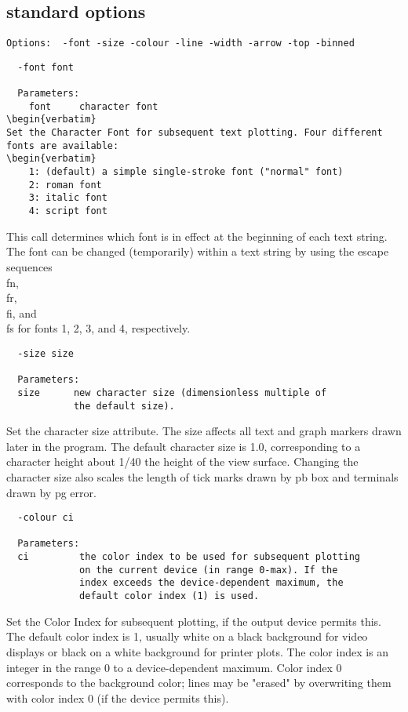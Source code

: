 \subsection{standard options}
\begin{verbatim}
Options:  -font -size -colour -line -width -arrow -top -binned
\end{verbatim}
\begin{verbatim}
  -font font
  
  Parameters:
    font     character font
\begin{verbatim}
Set the Character Font for subsequent text plotting. Four different
fonts are available:
\begin{verbatim}
    1: (default) a simple single-stroke font ("normal" font)
    2: roman font
    3: italic font
    4: script font
\end{verbatim}
This call determines which font is in effect at the beginning of
each text string. The font can be changed (temporarily) within a text
string by using the escape sequences \\fn, \\fr, \\fi, and \\fs for fonts
1, 2, 3, and 4, respectively.

\begin{verbatim}
  -size size

  Parameters:
  size      new character size (dimensionless multiple of
            the default size).
\end{verbatim}
Set the character size attribute. The size affects all text and graph
markers drawn later in the program. The default character size is
1.0, corresponding to a character height about 1/40 the height of
the view surface.  Changing the character size also scales the length
of tick marks drawn by pb box and terminals drawn by pg error.

\begin{verbatim}
  -colour ci

  Parameters:
  ci         the color index to be used for subsequent plotting
             on the current device (in range 0-max). If the
             index exceeds the device-dependent maximum, the
             default color index (1) is used.
\end{verbatim}
Set the Color Index for subsequent plotting, if the output device
permits this. The default color index is 1, usually white on a black
background for video displays or black on a white background for
printer plots. The color index is an integer in the range 0 to a
device-dependent maximum. Color index 0 corresponds to the background
color; lines may be "erased" by overwriting them with color index 0
(if the device permits this).

